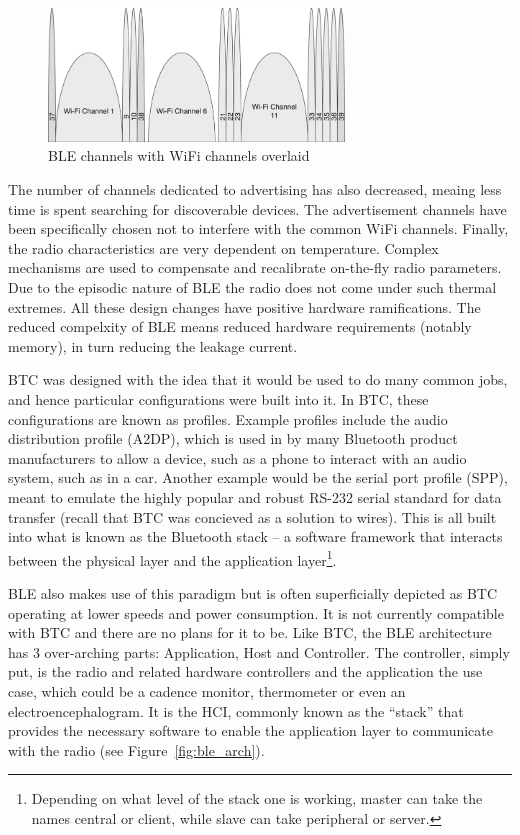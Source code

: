 \documentclass[]{article}
\begin{document}
\begin{figure}[htb]
	\begin{center}
		\includegraphics[width = 0.7\textwidth]{blechannelswifi}
	\end{center}
	\caption{\ac{BLE} channels with WiFi channels overlaid}
	\label{fig:blechannelswifi}
\end{figure}


The number of channels dedicated to advertising has also decreased, meaing less time is spent searching for discoverable devices. The advertisement channels have been specifically chosen not to interfere with the common WiFi channels. Finally, the radio characteristics are very dependent on temperature. Complex mechanisms are used to compensate and recalibrate on-the-fly radio parameters. Due to the episodic nature of \ac{BLE} the radio does not come under such thermal extremes. All these design changes have positive hardware ramifications. The reduced compelxity of \ac{BLE} means reduced hardware requirements (notably memory), in turn reducing the leakage current. 

\ac{BTC} was designed with the idea that it would be used to do many common jobs, and hence particular configurations were built into it. In \ac{BTC}, these configurations are known as profiles. Example profiles include the audio distribution profile (A2DP), which is used in by many Bluetooth product manufacturers to allow a device, such as a phone to interact with an audio system, such as in a car. Another example would be the serial port profile (SPP), meant to emulate the highly popular and robust RS-232 serial standard for data transfer (recall that \ac{BTC} was concieved as a solution to wires). This is all built into what is known as the Bluetooth stack – a software framework that interacts between the physical layer and the application layer\footnote{Depending on what level of the stack one is working, master can take the names central or client, while slave can take peripheral or server.}.  

\ac{BLE} also makes use of this paradigm but is often superficially depicted as \ac{BTC} operating at lower speeds and power consumption. It is not currently compatible with \ac{BTC} and there are no plans for it to be. Like \ac{BTC}, the \ac{BLE} architecture has 3 over-arching parts: Application, Host and Controller. The controller, simply put, is the radio and related hardware controllers and the application the use case, which could be a cadence monitor, thermometer or even an electroencephalogram. It is the \ac{HCI}, commonly known as the “stack” that provides the necessary software to enable the application layer to communicate with the radio (see Figure~\ref{fig:ble_arch}).
\end{document}
